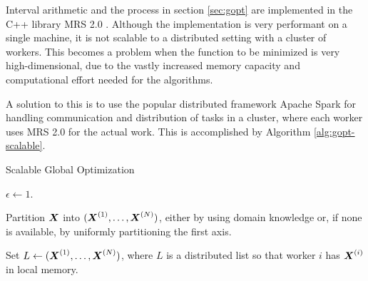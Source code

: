 \documentclass[scalable-gopt.tex]{subfiles}
\begin{document}
  Interval arithmetic and the process in section \ref{sec:gopt} 
  are implemented in the C++ library MRS 2.0 \cite{mrs2}.
  Although the implementation is very performant on a single machine, 
  it is not scalable to a distributed setting with a cluster of workers.
  This becomes a problem when the function to be minimized is very high-dimensional, 
  due to the vastly increased memory capacity and 
  computational effort needed for the algorithms.

  A solution to this is to use the popular distributed framework Apache Spark for 
  handling communication and distribution of tasks in a cluster, 
  where each worker uses MRS 2.0 for the actual work.
  This is accomplished by Algorithm \ref{alg:gopt-scalable}.

  \begin{algorithm}[!ht]
    \caption{Scalable Global Optimization}
    \label{alg:gopt-scalable}

    $\epsilon \gets 1$.
    
    Partition $\X$ into $(\X \ind 1, \dots, \X \ind N)$,
    either by using domain knowledge or, if none is available, 
    by uniformly partitioning the first axis.

    Set $L \gets (\X \ind 1, \dots, \X \ind N)$, 
    where $L$ is a distributed list so that 
    worker $i$ has $\X \ind i$ in local memory.


  \end{algorithm}
  
\end{document}
